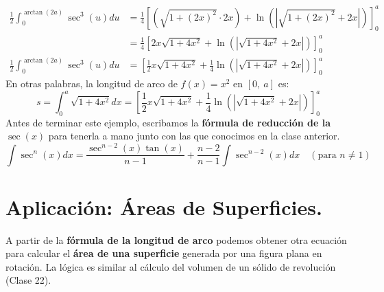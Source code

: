 \documentclass[12pt]{article}
\begin{document}
\begin{align*}
  \frac{1}{2} \int_{0}^{\arctan(2a)} \sec^{3}(u) du &= \frac{1}{4}
                                                       \left[
                                                         \left(\sqrt{1 + (2x)^{2}} \cdot 2x \right) +
                                                         \ln\left(\left|\sqrt{1 + (2x)^{2}} + 2x \right|\right)
                                                       \right]_{0}^{a} \\
                                                    &= \frac{1}{4}
                                                       \left[
                                                         2x \sqrt{1 + 4x^{2}} +
                                                         \ln\left(\left|\sqrt{1 + 4x^{2}} + 2x \right|\right)
                                                       \right]_{0}^{a} \\
  \frac{1}{2} \int_{0}^{\arctan(2a)} \sec^{3}(u) du &= \left[
                                                         \frac{1}{2} x \sqrt{1 + 4x^{2}} + 
                                                         \frac{1}{4} \ln\left(\left|\sqrt{1 + 4x^{2}} + 2x \right|\right)
                                                       \right]_{0}^{a}
\end{align*}
En otras palabras, la longitud de arco de $f(x) = x^{2}$ en $[0, \ a]$ es:
\[
  s = \int_{0}^{a} \sqrt{1 + 4x^{2}} dx = \left[
                                            \frac{1}{2} x \sqrt{1 + 4x^{2}} + 
                                            \frac{1}{4} \ln\left(\left|\sqrt{1 + 4x^{2}} + 2x \right|\right)
                                          \right]_{0}^{a}
\]
Antes de terminar este ejemplo, escribamos la \textbf{fórmula de reducción de la $\sec(x)$} para tenerla a mano junto con las que conocimos en la clase anterior.
\[
  \int \sec^{n}(x) dx = \frac{\sec^{n - 2}(x) \tan(x)}{n - 1} + \frac{n - 2}{n - 1} \int \sec^{n - 2}(x) dx \quad (\text{para } n \neq 1)
\]


\section{Aplicación: Áreas de Superficies.}

A partir de la \textbf{fórmula de la longitud de arco} podemos obtener otra ecuación para calcular el \textbf{área de una superficie} generada por una figura plana en rotación. La lógica es similar al cálculo del volumen de un sólido de revolución (Clase 22).
\end{document}
